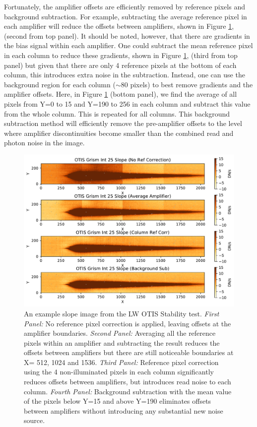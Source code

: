 \documentclass[]{aastex62}
\begin{document}
Fortunately, the amplifier offsets are efficiently removed by reference pixels and background subtraction.
For example, subtracting the average reference pixel in each amplifier will reduce the offsets between amplifiers, shown in Figure \ref{fig:ampOffsetsOtisGrismSlope}, (second from top panel).
It should be noted, however, that there are gradients in the bias signal within each amplifier.
One could subtract the mean reference pixel in each column to reduce these gradients, shown in Figure \ref{fig:ampOffsetsOtisGrismSlope}, (third from top panel) but given that there are only 4 reference pixels at the bottom of each column, this introduces extra noise in the subtraction.
Instead, one can use the background region for each column ($\sim$80 pixels) to best remove gradients and the amplifier offsets.
Here, in Figure \ref{fig:ampOffsetsOtisGrismSlope} (bottom panel), we find the average of all pixels from Y=0 to 15 and Y=190 to 256 in each column and subtract this value from the whole column.
This is repeated for all columns.
This background subtraction method will efficiently remove the pre-amplifier offsets to the level where amplifier discontinuities become smaller than the combined read and photon noise in the image.

\begin{figure}[!hbtp]
\centering
\includegraphics[width=.79\columnwidth]{amplifier_offsets_in_otis_lw_grism.pdf}
\caption{An example slope image from the LW OTIS Stability test.
{\it First Panel:} No reference pixel correction is applied, leaving offsets at the amplifier boundaries.
{\it Second Panel:} Averaging all the reference pixels within an amplifier and subtracting the result reduces the offsets between amplifiers but there are still noticeable boundaries at X= 512, 1024 and 1536.
{\it Third Panel:} Reference pixel correction using the 4 non-illuminated pixels in each column significantly reduces offsets between amplifiers, but introduces read noise to each column.
{\it Fourth Panel:} Background subtraction with the mean value of the pixels below Y=15 and above Y=190 eliminates offsets between amplifiers without introducing any substantial new noise source.
}\label{fig:ampOffsetsOtisGrismSlope}
\end{figure}
\end{document}

